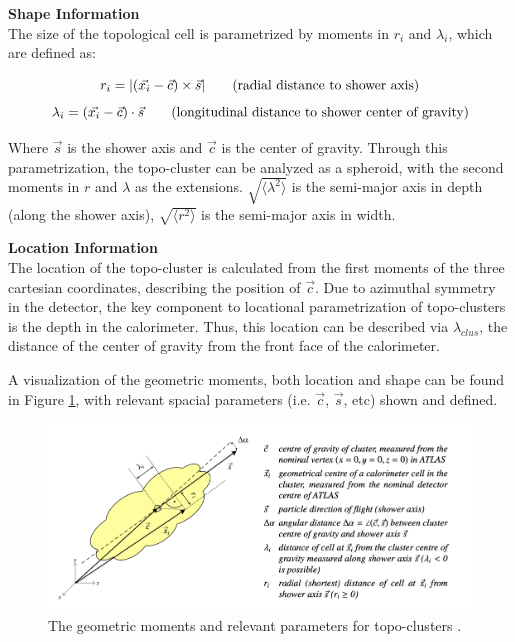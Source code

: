 \noindent\textbf{Shape Information}\\
\indent The size of the topological cell is parametrized by moments in $r_i$ and $\lambda_i$, which are defined as:

\begin{equation}
    r_i = |(\vec{x_i} - \vec{c}) \times \vec{s}| \text{\hspace{2em}(radial distance to shower axis)} \\
\end{equation}
\begin{equation}
    \lambda_i = (\vec{x_i} - \vec{c}) \cdot \vec{s} \text{\hspace{2em}(longitudinal distance to shower center of gravity)} 
\end{equation}

Where $\vec{s}$ is the shower axis and $\vec{c}$ is the center of gravity. Through this parametrization, the topo-cluster can be analyzed as a spheroid, with the second moments in $r$ and $\lambda$ as the extensions. $\sqrt{\langle \lambda^2 \rangle}$ is the semi-major axis in depth (along the shower axis), $\sqrt{\langle r^2 \rangle}$ is the semi-major axis in width.

\noindent\textbf{Location Information}\\
\indent The location of the topo-cluster is calculated from the first moments of the three cartesian coordinates, describing the position of $\vec{c}$. Due to azimuthal symmetry in the detector, the key component to locational parametrization of topo-clusters is the depth in the calorimeter. Thus, this location can be described via $\lambda_{clus}$, the distance of the center of gravity from the front face of the calorimeter.

A visualization of the geometric moments, both location and shape can be found in Figure \ref{fig:topo-geom}, with relevant spacial parameters (i.e. $\vec{c}$, $\vec{s}$, etc) shown and defined.

\begin{figure}[!thp]
    \centering
    \includegraphics[width=.90\textwidth]{chapters/chapter4_photonID/images/geom-moments.png}

    \caption[The geometric moments and relevant parameters for topo-clusters.]
    {The geometric moments and relevant parameters for topo-clusters \cite{topo-clustering-r1}.}
    \label{fig:topo-geom}
\end{figure}


